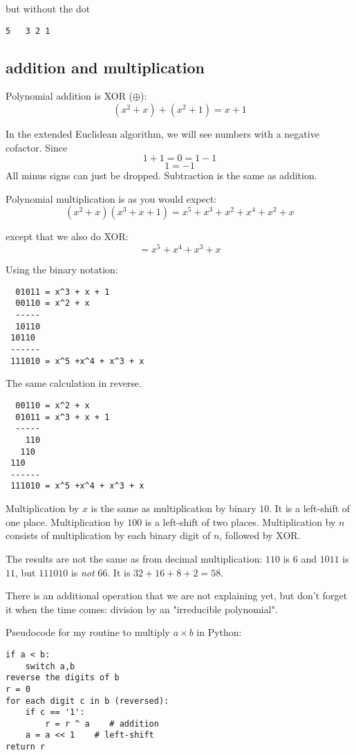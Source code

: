 \documentclass[11pt, oneside]{article}
\begin{document}
but without the dot
\begin{verbatim}
5   3 2 1
\end{verbatim}

\subsection*{addition and multiplication}

Polynomial addition is XOR ($\oplus$):
\[ (x^2 + x) + (x^2 + 1) = x + 1 \]

In the extended Euclidean algorithm, we will see numbers with a negative cofactor.  Since
\[ 1 + 1 = 0 = 1 - 1 \]
\[ 1 = - 1\]
All minus signs can just be dropped.  Subtraction is the same as addition.

Polynomial multiplication is as you would expect:
\[ (x^2 + x)(x^3 + x + 1) = x^5 + x^3 + x^2 + x^4 + x^2 + x \]

except that we also do XOR:
\[ = x^5 +x^4 + x^3 + x \]

Using the binary notation:
\begin{verbatim}
  01011 = x^3 + x + 1
  00110 = x^2 + x
  -----
  10110
 10110
 ------
 111010 = x^5 +x^4 + x^3 + x
\end{verbatim}

The same calculation in reverse.

\begin{verbatim}
  00110 = x^2 + x
  01011 = x^3 + x + 1
  -----
    110
   110
 110
 ------
 111010 = x^5 +x^4 + x^3 + x
\end{verbatim}

Multiplication by $x$ is the same as multiplication by binary $10$.  It is a left-shift of one place.  Multiplication by $100$ is a left-shift of two places.  Multiplication by $n$ consists of multiplication by each binary digit of $n$, followed by XOR.

The results are not the same as from decimal multiplication:  $110$ is $6$ and $1011$ is $11$, but $111010$ is \emph{not} $66$.  It is $32 + 16 + 8 + 2 = 58$.

There is an additional operation that we are not explaining yet, but don't forget it when the time comes:  division by an "irreducible polynomial".

Pseudocode for my routine to multiply $a \times b$ in Python:

\begin{verbatim}  
if a < b:
    switch a,b
reverse the digits of b
r = 0
for each digit c in b (reversed):
    if c == '1':
        r = r ^ a    # addition
    a = a << 1    # left-shift
return r
\end{verbatim}
\end{document}

